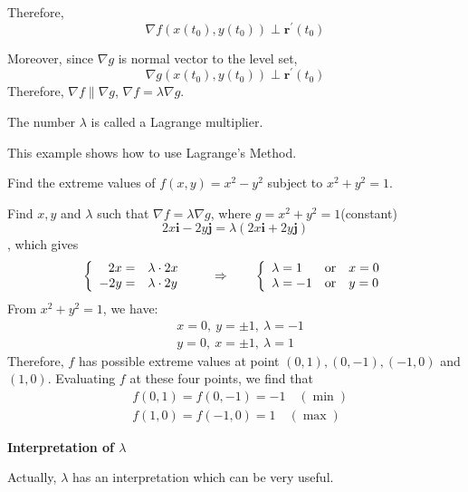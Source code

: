 \begin{spacing}{1.3}
    Therefore, 
    $$\nabla f\left(x\left(t_{0}\right), y\left(t_{0}\right)\right)  \perp \mathbf{r}^{\prime}\left(t_{0}\right)$$
    
    Moreover, since $\nabla g$ is normal vector to the level set,
    $$\nabla g\left(x\left(t_{0}\right), y\left(t_{0}\right)\right)  \perp \mathbf{r}^{\prime}\left(t_{0}\right) $$
    Therefore, $\nabla f \parallel \nabla g$, $\nabla f=\lambda \nabla g$.
    
    The number $\lambda$ is called a Lagrange multiplier.

    \newpage
    {\blue This example shows how to use Lagrange's Method.}

    \eg Find the extreme values of $f(x, y)=x^{2}-y^{2}$ subject to $x^{2}+y^{2}=1$.
    
    \sol Find $x, y$ and $\lambda$ such that
    $\nabla f=\lambda \nabla g$, where $g=x^{2}+y^{2}=1$(constant) 
    $$2 x \mathbf{i}-2 y \mathbf{j}=\lambda(2 x \mathbf{i}+2 y \mathbf{j})$$
    , which gives
    $$
    \left\{\begin{array}{rl}
        2x= & \lambda \cdot 2x\\
        -2y= & \lambda \cdot 2y
    \end{array} \right.  \qquad \Rightarrow \qquad 
    \left\{\begin{array}{lcl}
        \lambda = 1 & {\rm or} & x=0\\
        \lambda = -1 & {\rm or} & y=0\\
    \end{array} \right.
    $$
    From $x^2+y^2=1$, we have:
    \begin{align*}
        &x=0,\ y=\pm 1,\ \lambda = -1\\
        &y=0,\ x=\pm 1,\ \lambda = 1
    \end{align*}
    Therefore, $f$ has possible extreme values at point $(0,1),(0,-1),(-1,0)$ and $(1,0)$. Evaluating $f$ at these four points, we find that
    $$\begin{aligned}
        &f(0,1)=f(0,-1)=-1 \quad(\min ) \\
        &f(1,0)=f(-1,0)=1 \quad(\max )
    \end{aligned}$$



    \newpage
    {\bf Interpretation of $\lambda$}

    {}

    Actually, $\lambda$ has an interpretation which can be very useful.


\end{spacing}
